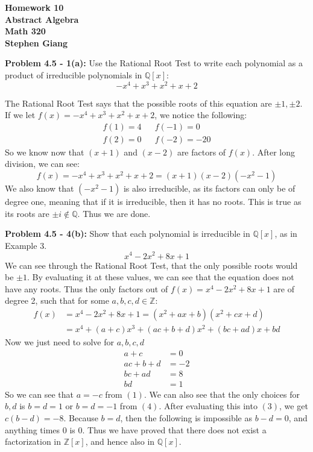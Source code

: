 \documentclass[12pt]{article}
\begin{document}
	
	\begin{center}
		\textbf{Homework 10} \\
		\textbf{Abstract Algebra} \\
		\textbf{Math 320} \\
		\textbf{Stephen Giang} \\
	\end{center}

\noindent \textbf{Problem 4.5 - 1(a): }Use the Rational Root Test to write each polynomial as a product of irreducible polynomials in $\mathbb{Q}[x]$:
	$$
	-x^4 +x^3 + x^2 + x + 2
	$$
	
The Rational Root Test says that the possible roots of this equation are $\pm 1, \pm 2$. If we let $f(x) = -x^4 +x^3 + x^2 + x + 2$, we notice the following:
	\begin{align*}
		f(1) = 4 && f(-1) = 0 \\
		f(2) = 0 && f(-2) = -20 
	\end{align*}
So we know now that $(x + 1)$ and $(x-2)$ are factors of $f(x)$.  After long division, we can see:
	$$
	f(x) = -x^4 +x^3 + x^2 + x + 2 = (x+1)(x-2)(-x^2 - 1)
	$$	
We also know that $(-x^2 - 1)$ is also irreducible, as its factors can only be of degree one, meaning that if it is irreducible, then it has no roots.  This is true as its roots are $\pm i \not \in \mathbb{Q}$.  Thus we are done.

\newpage 

\noindent \textbf{Problem 4.5 - 4(b): }Show that each polynomial is irreducible in $\mathbb{Q}[x]$, as in Example 3.
	$$
	x^4 - 2x^2 + 8x + 1
	$$
We can see through the Rational Root Test, that the only possible roots would be $\pm 1$.  By evaluating it at these values, we can see that the equation does not have any roots. Thus the only factors out of $f(x) = x^4 - 2x^2 + 8x + 1$ are of degree 2, such that for some $a,b,c,d \in \mathbb{Z}$:
	\begin{align*}
	f(x) &= x^4 - 2x^2 + 8x + 1 = (x^2 + ax + b)(x^2 + cx + d) \\
	&= x^4 + (a+c)x^3 + (ac + b + d)x^2 + (bc + ad)x + bd
	\end{align*}
Now we just need to solve for $a,b,c,d$
	\begin{align}
		a + c &= 0 \\
		ac + b + d &= -2 \\
		bc + ad &= 8 \\
		bd &= 1	
	\end{align}
So we can see that $a = -c$ from $(1)$.  We can also see that the only choices for $b,d$ is $b=d=1$ or $b=d=-1$ from $(4)$. After evaluating this into $(3)$, we get $c(b-d) = -8$.  Because $b=d$, then the following is impossible as $b-d = 0$, and anything times $0$ is $0$.  Thus we have proved that there does not exist a factorization in $\mathbb{Z}[x]$, and hence also in $\mathbb{Q}[x]$.
\end{document}
